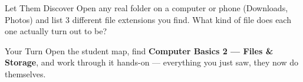 \documentclass[aspectratio=169]{beamer}
\begin{document}
\begin{frame}{Let Them Discover}
    \Large
    Open any real folder on a computer or phone (Downloads, Photos) and list 3 different file extensions you find. What kind of file does each one actually turn out to be?
\end{frame}

\begin{frame}{Your Turn}
    \Large
    Open the student map, find \textbf{Computer Basics 2 — Files \& Storage}, and work through it
    hands-on --- everything you just saw, they now do themselves.
\end{frame}
\end{document}
